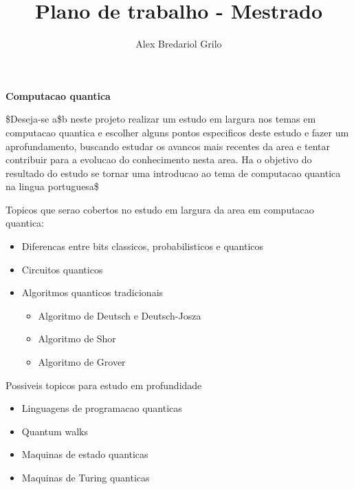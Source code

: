 \documentclass[a4paper,10pt]{article}
\title{Plano de trabalho - Mestrado}
\author{Alex Bredariol Grilo}
\begin{document}
\maketitle

\textbf{Computacao quantica}

\$Deseja-se a\$b neste projeto realizar um estudo em largura nos temas em computacao quantica e
escolher alguns pontos especificos deste estudo e fazer um aprofundamento, buscando
estudar os avancos mais recentes da area e tentar contribuir para a
evolucao do conhecimento nesta area. Ha o objetivo do resultado do estudo se tornar uma introducao ao tema de computacao
quantica na lingua portuguesa\$

Topicos que serao cobertos no estudo em largura da area em computacao quantica:
\begin{itemize}
\item Diferencas entre bits classicos, probabilisticos e quanticos
\item Circuitos quanticos
\item Algoritmos quanticos tradicionais
 \begin{itemize}
 \item Algoritmo de Deutsch e Deutsch-Josza
 \item Algoritmo de Shor
 \item Algoritmo de Grover
 \end{itemize}
\end{itemize}

Possiveis topicos para estudo em profundidade
\begin{itemize}
\item Linguagens de programacao quanticas
\item Quantum walks
\item Maquinas de estado quanticas
\item Maquinas de Turing quanticas
\end{itemize}
\end{document}
